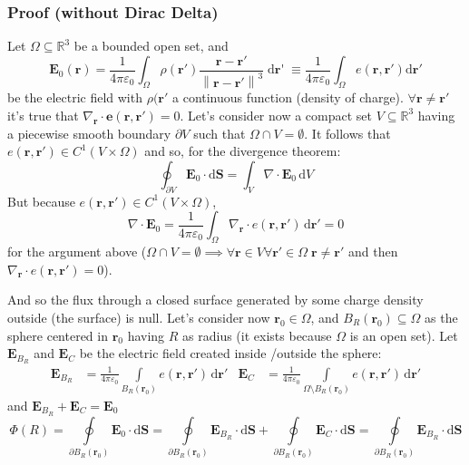 \documentclass[a4paper]{article}
\begin{document}
\subsubsection{Proof  (without Dirac Delta)}
Let \(\Omega \subseteq \mathbb{R}^3\) be a bounded open set, and
\[
    \mathbf{E}_{0}(\mathbf{r}) = 
    \frac{1}{4\pi \varepsilon_{0}}
    \int_{\Omega} \rho(\mathbf{r}')
    \frac{\mathbf{r} - \mathbf{r}'}{\left\|\mathbf {r} - \mathbf {r}'\right\|^{3}}
    \mathop{\mathrm{d}\mathbf{r}'}
    \equiv \frac{1}{4\pi \varepsilon _{0}}
    \int_{\Omega} e(\mathbf {r,\mathbf {r} '}){\mathrm {d} \mathbf {r}'}
\]
be the electric field with \(\rho(\mathbf{r}'\) a continuous function (density of charge).
\(\forall\mathbf{r} \neq \mathbf{r}'\) it's true that \(\nabla_\mathbf{r}  \cdot \mathbf{e} (\mathbf{r,r'} ) = 0\). 
Let's consider now a compact set \(V \subseteq \mathbb{R}^3\) having a piecewise smooth boundary \(\partial V\) such that \(\Omega \cap V = \emptyset\). It follows that \(e(\mathbf{r},\mathbf{r}') \in C^1(V \times \Omega)\) and so, for the divergence theorem:
\[
    \oint_{\partial V} \mathbf{E}_0 \cdot \mathrm{d}\mathbf{S} = \int_V \nabla \cdot \mathbf{E}_0 \, \mathrm{d}V
\]
But because \(e(\mathbf{r},\mathbf{r}') \in C^1(V \times \Omega)\),
\[
    \nabla \cdot \mathbf{E}_0 = 
    \frac{1}{4\pi\varepsilon_0}
    \int_\Omega \nabla_\mathbf{r} \cdot e(\mathbf{r}, \mathbf{r}')\, \mathrm{d}\mathbf{r}' = 0
\]
for the argument above (\(\Omega \cap V = \emptyset \implies \forall \mathbf{r} \in V \forall \mathbf{r}' \in \Omega \; \mathbf{r} \neq \mathbf{r}'\) and then \(\nabla_\mathbf{r} \cdot e(\mathbf{r}, \mathbf{r}') = 0\)).

And so the flux through a closed surface generated by some charge density outside (the surface) is null. 
Let's consider now \(\mathbf{r}_0 \in \Omega\), and \(B_R(\mathbf{r}_0) \subseteq \Omega\) as the sphere centered in \(\mathbf{r}_0\) having \(R\) as radius (it exists because \(\Omega\) is an open set).
Let \(\mathbf{E}_{B_R}\) and \(\mathbf{E}_C\) be the electric field created inside \slash outside the sphere:
\begin{align*}
    \mathbf{E}_{B_R} &= 
    \frac{1}{4\pi\varepsilon_0}
    \int\limits_{B_R(\mathbf{r}_0)}
        e(\mathbf{r},\mathbf{r}') \, \mathrm{d}\mathbf{r}'
    &
    \mathbf{E}_C &=
    \frac{1}{4\pi\varepsilon_0}
    \int\limits_{\Omega \setminus B_R(\mathbf{r}_0)}
        e(\mathbf{r},\mathbf{r}') \, \mathrm{d}\mathbf{r}'
\end{align*}
and
\(\mathbf{E}_{B_R} + \mathbf{E}_C = \mathbf{E}_0\)
\[
    \Phi(R) = \oint\limits_{\partial B_R(\mathbf{r}_0)}
        \mathbf{E}_0 \cdot \mathrm{d}\mathbf{S}
    = \oint\limits_{\partial B_R(\mathbf{r}_0)}
        \mathbf{E}_{B_R}
        \cdot \mathrm{d}\mathbf{S}
    + \oint\limits_{\partial B_R(\mathbf{r}_0)}
        \mathbf{E}_C
        \cdot \mathrm{d}\mathbf{S}
    = \oint\limits_{\partial B_R(\mathbf{r}_0)}
        \mathbf{E}_{B_R}
        \cdot \mathrm{d}\mathbf{S}
\]
\end{document}
